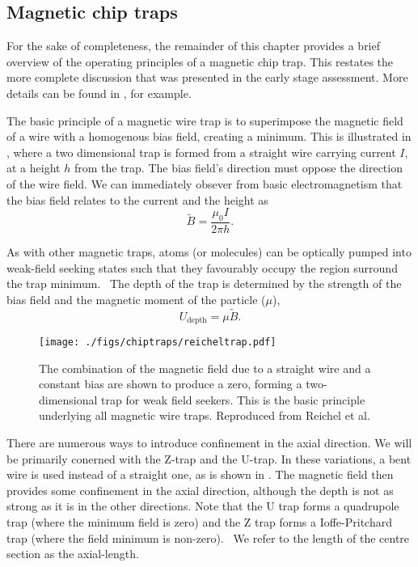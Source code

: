 \subsection*{Magnetic chip traps}

For the sake of completeness, the remainder of this chapter provides a brief
overview of the operating principles of a magnetic chip trap. This restates the
more complete discussion that was presented in the early stage assessment. More
details can be found in , for example.

The basic principle of a magnetic wire trap is to superimpose the magnetic
field of a wire with a homogenous bias field, creating a minimum. This is
illustrated in , where a two dimensional
trap is formed from a straight wire carrying current $I$, at a height $h$ from
the trap. 
The bias field's direction must oppose the
direction of the wire field. We can immediately obsever from basic
electromagnetism that the bias field relates to the current and the height as
%
\begin{equation}
  \tilde{B} = \frac{\mu_0 I}{2\pi h}.
  \label{into:eq:trapbias}
\end{equation}


As with other magnetic traps, atoms (or molecules) can be optically pumped into
weak-field seeking states such that they favourably occupy the region surround
the trap minimum.~\cite{Metcalf1999} The depth of the trap is determined by the
strength of the bias field and the magnetic moment of the particle ($\mu$),
%
\begin{equation}
  U_\text{depth} = \mu \tilde{B}. 
\end{equation}

\begin{figure}
  \centering
  \texttt{[image: ./figs/chiptraps/reicheltrap.pdf]}
  \caption{The combination of the magnetic field due to a straight wire and a
  constant bias are shown to produce a zero, forming a two-dimensional trap for
  weak field seekers. This is the basic principle underlying all magnetic wire
  traps. Reproduced from Reichel et al.~\cite{Reichel1999}
  }
  \label{intro:fig:reicheltrap}
\end{figure}

There are numerous ways to introduce confinement in the axial direction. We
will be primarily conerned with the Z-trap and the U-trap. In these variations,
a bent wire is used instead of a straight one, as is shown in
. The magnetic field then provides some confinement in the
axial direction, although the depth is not as strong as it is in the other
directions. Note that the U trap forms a quadrupole trap (where the minimum
field is zero) and the Z trap forms a Ioffe-Pritchard trap (where the field
minimum is non-zero).~\cite{} We refer to the length of the centre section as
the axial-length.


